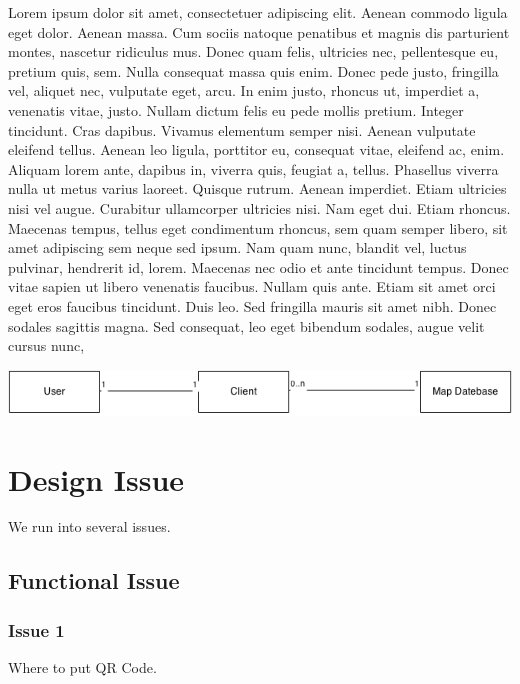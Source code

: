 \documentclass[12pt]{article}
\begin{document}
Lorem ipsum dolor sit amet, consectetuer adipiscing elit. Aenean commodo ligula eget dolor. Aenean massa. Cum sociis natoque penatibus et magnis dis parturient montes, nascetur ridiculus mus. Donec quam felis, ultricies nec, pellentesque eu, pretium quis, sem. Nulla consequat massa quis enim. Donec pede justo, fringilla vel, aliquet nec, vulputate eget, arcu. In enim justo, rhoncus ut, imperdiet a, venenatis vitae, justo. Nullam dictum felis eu pede mollis pretium. Integer tincidunt. Cras dapibus. Vivamus elementum semper nisi. Aenean vulputate eleifend tellus. Aenean leo ligula, porttitor eu, consequat vitae, eleifend ac, enim. Aliquam lorem ante, dapibus in, viverra quis, feugiat a, tellus. Phasellus viverra nulla ut metus varius laoreet. Quisque rutrum. Aenean imperdiet. Etiam ultricies nisi vel augue. Curabitur ullamcorper ultricies nisi. Nam eget dui. Etiam rhoncus. Maecenas tempus, tellus eget condimentum rhoncus, sem quam semper libero, sit amet adipiscing sem neque sed ipsum. Nam quam nunc, blandit vel, luctus pulvinar, hendrerit id, lorem. Maecenas nec odio et ante tincidunt tempus. Donec vitae sapien ut libero venenatis faucibus. Nullam quis ante. Etiam sit amet orci eget eros faucibus tincidunt. Duis leo. Sed fringilla mauris sit amet nibh. Donec sodales sagittis magna. Sed consequat, leo eget bibendum sodales, augue velit cursus nunc,

\begin{center}
\includegraphics[scale=0.8]{image/user_outline.png}
\end{center}



\section{Design Issue}

We run into several issues.

\subsection{Functional Issue}
\subsubsection{Issue 1}

Where to put QR Code. \\ \\
\end{document}
